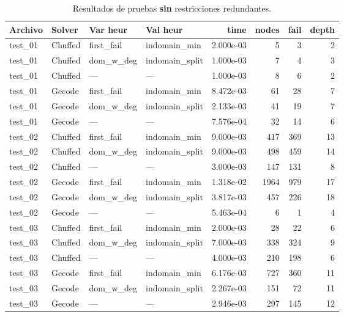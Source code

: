 \begin{compactfloats}
\begin{table}[H]
  \centering
  \small
  \setlength{\tabcolsep}{2.8pt}
  \caption{Resultados de pruebas \textbf{sin} restricciones redundantes.}
  \label{tab:pruebas-sudoku-off}
  \begin{tabular}{l l l l r r r r}
    \toprule
    \textbf{Archivo} & \textbf{Solver} & \textbf{Var heur} & \textbf{Val heur} & \textbf{time} & \textbf{nodes} & \textbf{fail} & \textbf{depth} \\
    \midrule
    test\_01 & Chuffed & first\_fail  & indomain\_min   & 2.000e-03 & 5   & 3   & 2 \\
    test\_01 & Chuffed & dom\_w\_deg  & indomain\_split & 1.000e-03 & 7   & 4   & 3 \\
    test\_01 & Chuffed & ---          & ---              & 1.000e-03 & 8   & 6   & 2 \\
    test\_01 & Gecode  & first\_fail  & indomain\_min   & 8.472e-03 & 61  & 28  & 7 \\
    test\_01 & Gecode  & dom\_w\_deg  & indomain\_split & 2.133e-03 & 41  & 19  & 7 \\
    test\_01 & Gecode  & ---          & ---              & 7.576e-04 & 32  & 14  & 6 \\
    \midrule
    test\_02 & Chuffed & first\_fail  & indomain\_min   & 9.000e-03 & 417 & 369 & 13 \\
    test\_02 & Chuffed & dom\_w\_deg  & indomain\_split & 9.000e-03 & 498 & 459 & 14 \\
    test\_02 & Chuffed & ---          & ---              & 3.000e-03 & 147 & 131 & 8 \\
    test\_02 & Gecode  & first\_fail  & indomain\_min   & 1.318e-02 & 1964 & 979 & 17 \\
    test\_02 & Gecode  & dom\_w\_deg  & indomain\_split & 3.817e-03 & 457  & 226 & 18 \\
    test\_02 & Gecode  & ---          & ---              & 5.463e-04 & 6    & 1   & 4 \\
    \midrule
    test\_03 & Chuffed & first\_fail  & indomain\_min   & 2.000e-03 & 28  & 22  & 6 \\
    test\_03 & Chuffed & dom\_w\_deg  & indomain\_split & 7.000e-03 & 338 & 324 & 9 \\
    test\_03 & Chuffed & ---          & ---              & 4.000e-03 & 210 & 198 & 6 \\
    test\_03 & Gecode  & first\_fail  & indomain\_min   & 6.176e-03 & 727 & 360 & 11 \\
    test\_03 & Gecode  & dom\_w\_deg  & indomain\_split & 2.267e-03 & 151 & 72  & 11 \\
    test\_03 & Gecode  & ---          & ---              & 2.946e-03 & 297 & 145 & 12 \\
    \bottomrule
  \end{tabular}
\end{table}
\end{compactfloats}

\FloatBarrier
